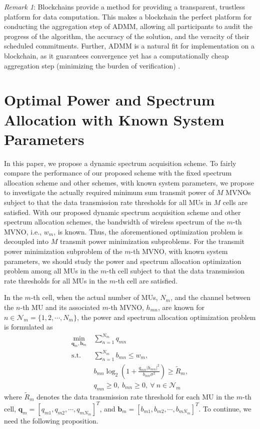 \documentclass[journal]{IEEEtran}
\begin{document}
 \emph{Remark {\color{red}1}}: Blockchains provide a method for providing a transparent, trustless platform for data computation. This makes a blockchain the perfect platform for conducting the aggregation step of ADMM, allowing all participants to audit the progress of the algorithm, the accuracy of the solution, and the veracity of their scheduled commitments. Further, ADMM is a natural fit for implementation on a blockchain, as it guarantees
convergence yet has a computationally cheap aggregation step (minimizing the burden of verification) \cite{Munsing}.

\section{Optimal Power and Spectrum Allocation with Known System Parameters}

In this paper, we propose a dynamic spectrum acquisition scheme. To fairly compare the performance of our proposed scheme with the fixed spectrum allocation scheme and other schemes, with known system parameters, we propose to investigate the {\color{red} actually}  required minimum sum transmit power of $M$ MVNOs subject to that the data transmission rate thresholds for all MUs in $M$ cells are satisfied. With our proposed dynamic spectrum acquisition scheme and other spectrum allocation schemes, the bandwidth of wireless spectrum of the $m$-th MVNO, i.e., $w_m$, is known. Thus, the aforementioned optimization problem is decoupled into $M$ transmit power minimization subproblems. For the transmit power minimization subproblem of the $m$-th MVNO, with known system parameters, we should study the power and spectrum allocation optimization problem among all MUs in the $m$-th cell subject to that the data transmission rate thresholds for all MUs in the $m$-th cell are satisfied.

In the $m$-th cell, when the actual number of MUs, $N_m$, and the channel between the $n$-th MU and its associated $m$-th MVNO, $h_{mn}$, are known for $n\in\mathcal{N}_m=\{1,2,\cdots,N_m\}$, the power and spectrum allocation optimization problem is formulated as
\begin{subequations}\label{cq1}
\begin{align}
\label{cq1a} \min_{\mathbf{q}_m, \mathbf{b}_m}\ & \sum\limits_{n=1}^{N_m} q_{mn} \\
\label{cq1b}\mbox{s.t.} \quad &  \sum\limits_{n=1}^{N_m} b_{mn} \leq w_m,\\ \label{cq1c}&  b_{mn}\log_2\left(1 + \frac{q_{mn}\left|h_{mn}\right|^2}{b_{mn}\sigma^2}\right) \geq \tilde{R}_m,\\
\label{cq1d}& q_{mn} \geq 0,\ b_{mn} \geq 0,\ \forall\ n\in\mathcal{N}_m
\end{align}
\end{subequations}
where $\tilde{R}_m$ denotes the data transmission rate threshold for each
MU in the $m$-th cell, $\mathbf{q}_m=\left[q_{m1}, q_{m2}, \cdots, q_{mN_m}\right]^T$, and $\mathbf{b}_m=\left[b_{m1}, b_{m2}, \cdots, b_{mN_m}\right]^T$. To continue, we need the following proposition.
\end{document}
